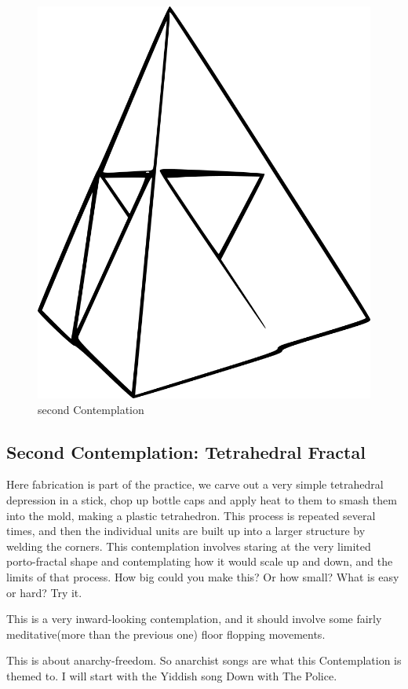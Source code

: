 \begin{figure}[htbp]
\centering
\includegraphics{images/contemplations/contemplation2C.png}
\caption{second Contemplation}
\end{figure}

\subsection{Second Contemplation: Tetrahedral
Fractal}\label{second-contemplation-tetrahedral-fractal}

Here fabrication is part of the practice, we carve out a very simple
tetrahedral depression in a stick, chop up bottle caps and apply heat to
them to smash them into the mold, making a plastic tetrahedron. This
process is repeated several times, and then the individual units are
built up into a larger structure by welding the corners. This
contemplation involves staring at the very limited porto-fractal shape
and contemplating how it would scale up and down, and the limits of that
process. How big could you make this? Or how small? What is easy or
hard? Try it.

This is a very inward-looking contemplation, and it should involve some
fairly meditative(more than the previous one) floor flopping movements.

This is about anarchy-freedom. So anarchist songs are what this
Contemplation is themed to. I will start with the Yiddish song Down with
The Police.
